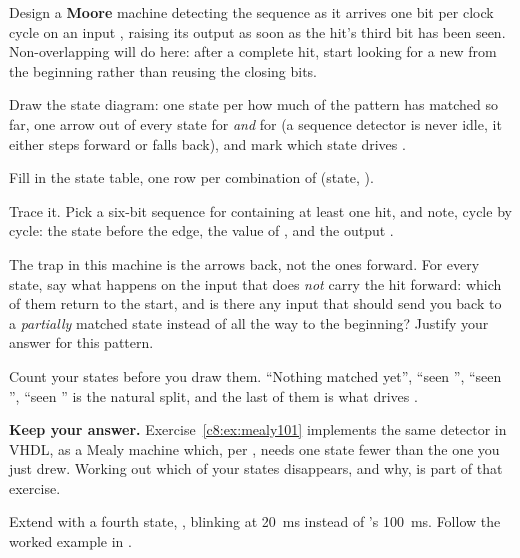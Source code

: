 
\label{c8:ex:moore101}
Design a \textbf{Moore} machine detecting the sequence  as it arrives one bit per
clock cycle on an input , raising its output  as soon as the hit's third bit has
been seen. Non-overlapping will do here: after a complete hit, start looking for a new
 from the beginning rather than reusing the closing bits.

 Draw the state diagram: one state per how much of the pattern has matched so far, one
arrow out of every state for  \emph{and} for  (a sequence detector is
never idle, it either steps forward or falls back), and mark which state drives .

 Fill in the state table, one row per combination of (state, ).

 Trace it. Pick a six-bit sequence for  containing at least one hit, and note,
cycle by cycle: the state before the edge, the value of , and the output .

 The trap in this machine is the arrows back, not the ones forward. For every state, say
what happens on the input that does \emph{not} carry the hit forward: which of them return to the
start, and is there any input that should send you back to a \emph{partially} matched state instead
of all the way to the beginning? Justify your answer for this pattern.

\note[Hint]Count your states before you draw them. ``Nothing matched yet'', ``seen '',
``seen '', ``seen '' is the natural split, and the last of them is what drives
.

\textbf{Keep your answer.} Exercise~\ref{c8:ex:mealy101} implements the same detector in VHDL, as a
Mealy machine \textemdash{} which, per , needs one state fewer than the one you
just drew. Working out which of your states disappears, and why, is part of that exercise.


\label{c8:ex:fastblink}
Extend  with a fourth state, , blinking at 20~ms instead of
's 100~ms. Follow the worked example in .

